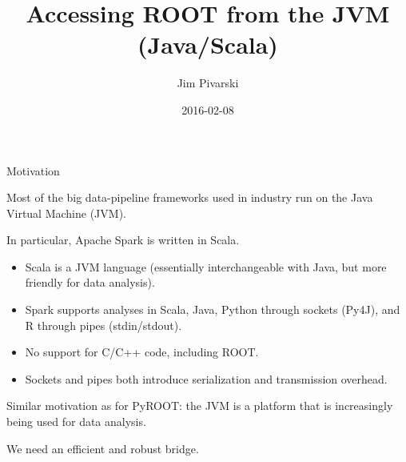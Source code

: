 \documentclass{beamer}
\title[2016-02-08-ROOT-JVM-firsttalk]{Accessing ROOT from the JVM (Java/Scala)}
\author{Jim Pivarski}
\date{2016-02-08}
\begin{document}
\begin{frame}
  \titlepage
\end{frame}


\begin{frame}{Motivation}
\begin{block}{}
\vspace{-\baselineskip}
Most of the big data-pipeline frameworks used in industry run on the Java Virtual Machine (JVM).
\end{block}

\begin{block}{}
\vspace{-\baselineskip}
In particular, Apache Spark is written in Scala.
\begin{itemize}
\item Scala is a JVM language (essentially interchangeable with Java, but more friendly for data analysis).
\item Spark supports analyses in Scala, Java, Python through sockets (Py4J), and R through pipes (stdin/stdout).
\item No support for C/C++ code, including ROOT.
\item Sockets and pipes both introduce serialization and transmission overhead.
\end{itemize}
\end{block}

\begin{block}{}
\vspace{-\baselineskip}
Similar motivation as for PyROOT: the JVM is a platform that is increasingly being used for data analysis.

\vspace{0.5\baselineskip}
We need an efficient and robust bridge.
\end{block}
\end{frame}
\end{document}
